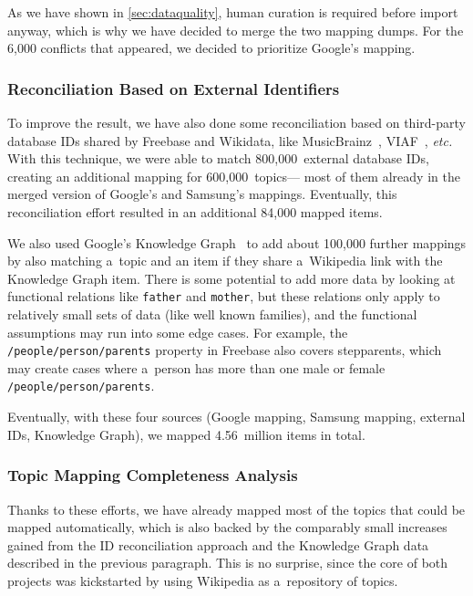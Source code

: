 \documentclass{sig-alternate-2013}
\begin{document}
As we have shown in \autoref{sec:dataquality},
human curation is required before import anyway,
which is why we have decided to merge the two mapping dumps.
For the 6,000 conflicts that appeared, we decided to prioritize Google's mapping.

\subsubsection{Reconciliation Based on External Identifiers}

To improve the result, we have also done some reconciliation based on third-party database IDs
shared by Freebase and Wikidata, like MusicBrainz~\cite{musicbrainz},
VIAF~\cite{viaf}, \emph{etc.}
With this technique, we were able to match 800,000~external data\-base IDs,
creating an additional mapping for 600,000~to\-pics---%
most of them already in the merged version of Google's and Samsung's mappings.
Eventually, this reconciliation effort resulted in an additional 84,000 mapped items.

We also used Google's Knowledge Graph~\cite{singhal2012} to add about 100,000 further mappings
by also matching a~topic and an item if they share a~Wikipedia link with the Knowledge Graph item.
There is some potential to add more data by looking at functional relations
like \texttt{father} and \texttt{mother},
but these relations only apply to relatively small sets of data
(like well known families), and the functional assumptions may run into some edge cases.
For example, the \texttt{/people/person/parents} property in Freebase also covers stepparents,
which may create cases where a~person has more than one male or female \texttt{/people/person/parents}.

Eventually, with these four sources (Google mapping, Samsung mapping, external IDs, Knowledge Graph),
we mapped 4.56~million items in total.

\subsubsection{Topic Mapping Completeness Analysis}

Thanks to these efforts, we have already mapped most of the topics that could be mapped automatically,
which is also backed by the comparably small increases gained from the ID reconciliation approach
and the Knowledge Graph data described in the previous paragraph.
This is no surprise, since the core of both projects was kickstarted by using
Wikipedia as a~repository of topics.
\end{document}
